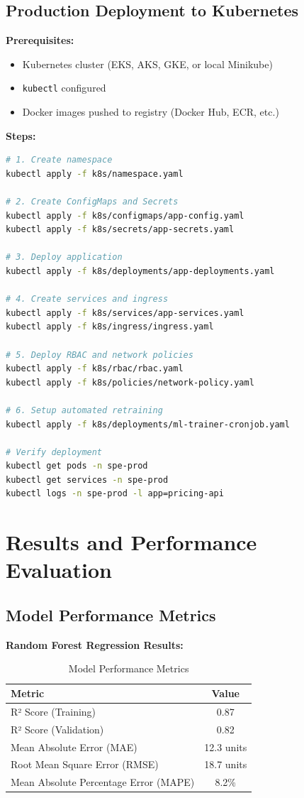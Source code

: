 \documentclass[12pt,a4paper]{report}
\begin{document}
\section{Production Deployment to Kubernetes}

\textbf{Prerequisites:}
\begin{itemize}[leftmargin=2em]
    \item Kubernetes cluster (EKS, AKS, GKE, or local Minikube)
    \item \texttt{kubectl} configured
    \item Docker images pushed to registry (Docker Hub, ECR, etc.)
\end{itemize}

\textbf{Steps:}
\begin{lstlisting}[language=bash]
# 1. Create namespace
kubectl apply -f k8s/namespace.yaml

# 2. Create ConfigMaps and Secrets
kubectl apply -f k8s/configmaps/app-config.yaml
kubectl apply -f k8s/secrets/app-secrets.yaml

# 3. Deploy application
kubectl apply -f k8s/deployments/app-deployments.yaml

# 4. Create services and ingress
kubectl apply -f k8s/services/app-services.yaml
kubectl apply -f k8s/ingress/ingress.yaml

# 5. Deploy RBAC and network policies
kubectl apply -f k8s/rbac/rbac.yaml
kubectl apply -f k8s/policies/network-policy.yaml

# 6. Setup automated retraining
kubectl apply -f k8s/deployments/ml-trainer-cronjob.yaml

# Verify deployment
kubectl get pods -n spe-prod
kubectl get services -n spe-prod
kubectl logs -n spe-prod -l app=pricing-api
\end{lstlisting}

\chapter{Results and Performance Evaluation}

\section{Model Performance Metrics}

\textbf{Random Forest Regression Results:}

\begin{table}[H]
    \centering
    \caption{Model Performance Metrics}
    \begin{tabular}{|l|c|}
    \hline
    \textbf{Metric} & \textbf{Value} \\
    \hline
    R² Score (Training) & 0.87 \\
    R² Score (Validation) & 0.82 \\
    Mean Absolute Error (MAE) & 12.3 units \\
    Root Mean Square Error (RMSE) & 18.7 units \\
    Mean Absolute Percentage Error (MAPE) & 8.2\% \\
    \hline
    \end{tabular}
\end{table}
\end{document}
